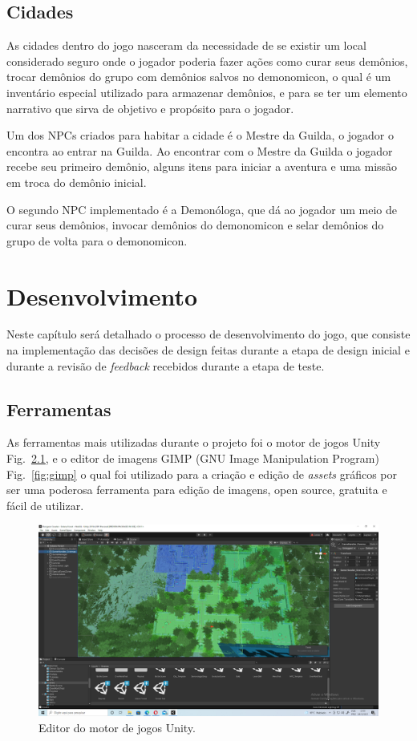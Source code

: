 \section{Cidades}\label{cidades}

As cidades dentro do jogo nasceram da necessidade de se existir um local considerado seguro onde o jogador poderia fazer ações como curar seus demônios, trocar demônios do grupo com demônios salvos no demonomicon, o qual é um inventário especial utilizado para armazenar demônios, e para se ter um elemento narrativo que sirva de objetivo e propósito para o jogador.
	
	Um dos NPCs criados para habitar a cidade é o Mestre da Guilda, o jogador o encontra ao entrar na Guilda. Ao encontrar com o Mestre da Guilda o jogador recebe seu primeiro demônio, alguns itens para iniciar a aventura e uma missão em troca do demônio inicial.

	O segundo NPC implementado é a Demonóloga, que dá ao jogador um meio de curar seus demônios, invocar demônios do demonomicon e selar demônios do grupo de volta para o demonomicon.

\chapter{Desenvolvimento}

Neste capítulo será detalhado o processo de desenvolvimento do jogo, que consiste na implementação das decisões de design feitas durante a etapa de design inicial e durante a revisão de \emph{feedback} recebidos durante a etapa de teste.

\section{Ferramentas}

As ferramentas mais utilizadas durante o projeto foi o motor de jogos Unity Fig.~\ref{fig:editor}, e o editor de imagens GIMP (GNU Image Manipulation Program) Fig.~\ref{fig:gimp} o qual foi utilizado para a criação e edição de \emph{assets} gráficos por ser uma poderosa ferramenta para edição de imagens, open source, gratuita e fácil de utilizar.

\begin{figure}[h!]
 \centering
  \includegraphics[width=0.70\linewidth]{unityeditor.jpg}
  \caption{Editor do motor de jogos Unity.}
  \label{fig:editor}
\end{figure}


